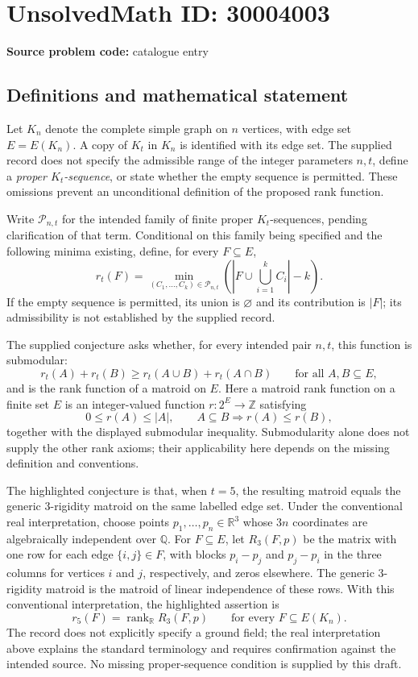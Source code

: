 \documentclass[11pt]{article}
\newcommand{\Z}{\mathbb{Z}}
\newcommand{\Q}{\mathbb{Q}}
\newcommand{\R}{\mathbb{R}}
\begin{document}
\section*{UnsolvedMath ID: 30004003}
\textbf{Source problem code:} catalogue entry
\subsection{Definitions and mathematical statement}
Let \(K_n\) denote the complete simple graph on \(n\) vertices, with edge set \(E=E(K_n)\). A copy of \(K_t\) in \(K_n\) is identified with its edge set. The supplied record does not specify the admissible range of the integer parameters \(n,t\), define a \emph{proper \(K_t\)-sequence}, or state whether the empty sequence is permitted. These omissions prevent an unconditional definition of the proposed rank function.

Write \(\mathcal P_{n,t}\) for the intended family of finite proper \(K_t\)-sequences, pending clarification of that term. Conditional on this family being specified and the following minima existing, define, for every \(F\subseteq E\),
\[
 r_t(F)=\min_{(C_1,\ldots,C_k)\in\mathcal P_{n,t}}
 \left(\left|F\cup\bigcup_{i=1}^{k}C_i\right|-k\right).
\]
If the empty sequence is permitted, its union is \(\varnothing\) and its contribution is \(|F|\); its admissibility is not established by the supplied record.

The supplied conjecture asks whether, for every intended pair \(n,t\), this function is submodular:
\[
 r_t(A)+r_t(B)\ge r_t(A\cup B)+r_t(A\cap B)
 \qquad\text{for all }A,B\subseteq E,
\]
and is the rank function of a matroid on \(E\). Here a matroid rank function on a finite set \(E\) is an integer-valued function \(r:2^E\to\Z\) satisfying
\[
 0\le r(A)\le |A|,\qquad
 A\subseteq B\Longrightarrow r(A)\le r(B),
\]
together with the displayed submodular inequality. Submodularity alone does not supply the other rank axioms; their applicability here depends on the missing definition and conventions.

The highlighted conjecture is that, when \(t=5\), the resulting matroid equals the generic \(3\)-rigidity matroid on the same labelled edge set. Under the conventional real interpretation, choose points \(p_1,\ldots,p_n\in\R^3\) whose \(3n\) coordinates are algebraically independent over \(\Q\). For \(F\subseteq E\), let \(R_3(F,p)\) be the matrix with one row for each edge \(\{i,j\}\in F\), with blocks \(p_i-p_j\) and \(p_j-p_i\) in the three columns for vertices \(i\) and \(j\), respectively, and zeros elsewhere. The generic \(3\)-rigidity matroid is the matroid of linear independence of these rows. With this conventional interpretation, the highlighted assertion is
\[
 r_5(F)=\operatorname{rank}_{\R}R_3(F,p)
 \qquad\text{for every }F\subseteq E(K_n).
\]
The record does not explicitly specify a ground field; the real interpretation above explains the standard terminology and requires confirmation against the intended source. No missing proper-sequence condition is supplied by this draft.
\end{document}

